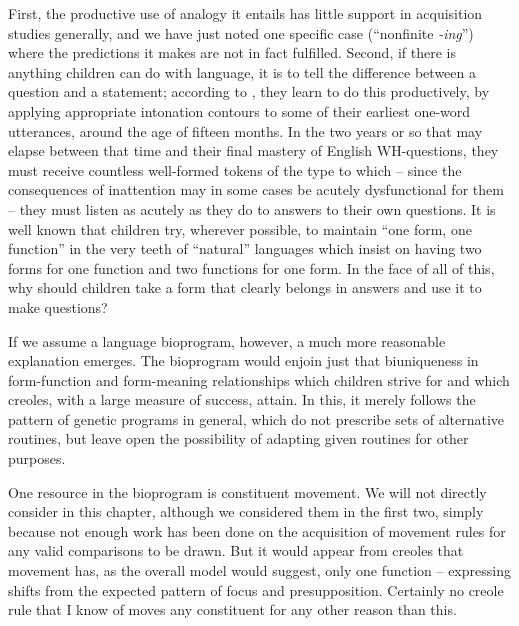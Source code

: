 First, the productive use of analogy it entails has little support in acquisition studies generally, and we have just noted one specific case (``nonfinite \textit{-ing}'') where the predictions it makes are not in fact fulfilled. Second, if there is anything children can do with language, it is to tell the difference between a question and a statement; according to \citet{Halliday1975}, they learn to do this productively, by applying appropriate intonation contours to some of their earliest one-word utterances, around the age of fifteen months. In the two years or so that may elapse between that time and their final mastery of English WH-questions, they must receive countless well-formed tokens of the type to which -- since the consequences of inattention may in some cases be acutely dysfunctional for them -- they must listen as acutely as they do to answers to their own questions. It is well known that children try, wherever possible, to maintain ``one form, one function'' in the very teeth of ``natural'' languages which insist on having two forms for one function and two functions for one form. In the face of
all of this, why should children take a form that clearly belongs in answers and use it to make questions?

If we assume a language bioprogram, however, a much more reasonable explanation emerges. The bioprogram would enjoin just that biuniqueness in form-function and form-meaning relationships which children strive for and which creoles, with a large measure of success, attain. In this, it merely follows the pattern of genetic programs in general, which do not prescribe sets of alternative routines, but leave open the possibility of adapting given routines for other purposes.

One resource in the bioprogram is constituent movement. We will not directly consider  in this chapter, although we considered them in the first two, simply because not enough work has been done on the acquisition of movement rules for any valid comparisons to be drawn. But it would appear from creoles that movement has, as the overall model would suggest, only one function -- expressing shifts from the expected pattern of focus and presupposition. Certainly no creole rule that I know of moves any constituent for any other reason than this.

